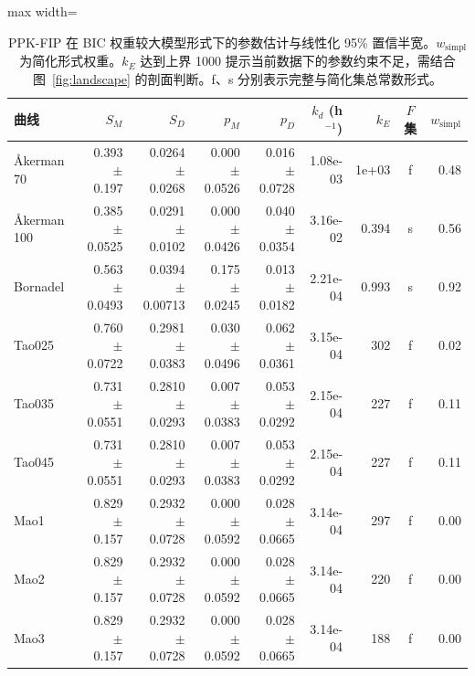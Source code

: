\begin{table}[t]
\centering
\caption{PPK-FIP 在 BIC 权重较大模型形式下的参数估计与线性化 95\% 置信半宽。$w_\mathrm{simpl}$ 为简化形式权重。$k_E$ 达到上界 1000 提示当前数据下的参数约束不足，需结合图~\ref{fig:landscape} 的剖面判断。f、s 分别表示完整与简化集总常数形式。}\label{tab:params}
\footnotesize
\begin{adjustbox}{max width=\linewidth}
\begin{tabular}{lrrrrrrcr}
\toprule
曲线 & $S_M$ & $S_D$ & $p_M$ & $p_D$ & $k_d$ (h$^{-1}$) & $k_E$ & $F$ 集 & $w_\mathrm{simpl}$ \\
\midrule
Åkerman 70 & 0.393 $\pm$ 0.197 & 0.0264 $\pm$ 0.0268 & 0.000 $\pm$ 0.0526 & 0.016 $\pm$ 0.0728 & 1.08e-03 & 1e+03 & f & 0.48 \\
Åkerman 100 & 0.385 $\pm$ 0.0525 & 0.0291 $\pm$ 0.0102 & 0.000 $\pm$ 0.0426 & 0.040 $\pm$ 0.0354 & 3.16e-02 & 0.394 & s & 0.56 \\
Bornadel & 0.563 $\pm$ 0.0493 & 0.0394 $\pm$ 0.00713 & 0.175 $\pm$ 0.0245 & 0.013 $\pm$ 0.0182 & 2.21e-04 & 0.993 & s & 0.92 \\
Tao025 & 0.760 $\pm$ 0.0722 & 0.2981 $\pm$ 0.0383 & 0.030 $\pm$ 0.0496 & 0.062 $\pm$ 0.0361 & 3.15e-04 & 302 & f & 0.02 \\
Tao035 & 0.731 $\pm$ 0.0551 & 0.2810 $\pm$ 0.0293 & 0.007 $\pm$ 0.0383 & 0.053 $\pm$ 0.0292 & 2.15e-04 & 227 & f & 0.11 \\
Tao045 & 0.731 $\pm$ 0.0551 & 0.2810 $\pm$ 0.0293 & 0.007 $\pm$ 0.0383 & 0.053 $\pm$ 0.0292 & 2.15e-04 & 227 & f & 0.11 \\
Mao1 & 0.829 $\pm$ 0.157 & 0.2932 $\pm$ 0.0728 & 0.000 $\pm$ 0.0592 & 0.028 $\pm$ 0.0665 & 3.14e-04 & 297 & f & 0.00 \\
Mao2 & 0.829 $\pm$ 0.157 & 0.2932 $\pm$ 0.0728 & 0.000 $\pm$ 0.0592 & 0.028 $\pm$ 0.0665 & 3.14e-04 & 220 & f & 0.00 \\
Mao3 & 0.829 $\pm$ 0.157 & 0.2932 $\pm$ 0.0728 & 0.000 $\pm$ 0.0592 & 0.028 $\pm$ 0.0665 & 3.14e-04 & 188 & f & 0.00 \\
\bottomrule
\end{tabular}
\end{adjustbox}
\end{table}
